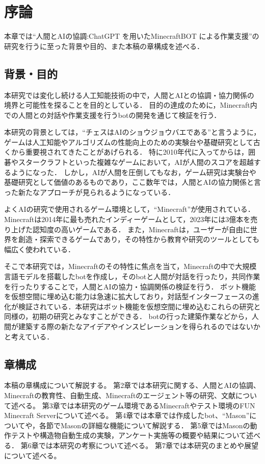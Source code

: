 \chapter{序論}	
\thispagestyle{plain}   %

本章では``人間とAIの協調:ChatGPT を用いたMinecraftBOT による作業支援''の研究を行うに至った背景や目的、また本稿の章構成を述べる．

\section{背景・目的}
本研究では変化し続ける人工知能技術の中で，人間とAIとの協調・協力関係の境界と可能性を探ることを目的としている．
目的の達成のために，Minecraft内での人間との対話や作業支援を行うbotの開発を通じて検証を行う．

本研究の背景としては，``チェスはAIのショウジョウバエである''\cite{bib:chess}と言うように，ゲームは人工知能やアルゴリズムの性能向上のための実験台や基礎研究として古くから重要視されてきたことがあげられる．
特に2010年代に入ってからは，囲碁やスタークラフトといった複雑なゲームにおいて，AIが人間のスコアを超越するようになった\cite{bib:AplpaGo,bibAlphaStar}．
しかし，AIが人間を圧倒してもなお，ゲーム研究は実験台や基礎研究として価値のあるものであり，ここ数年では，人間とAIの協力関係と言った新たなアプローチが見られるようになっている\cite{bib:maia,bib:craft_assist}．

よくAIの研究で使用されるゲーム環境として，``Minecraft''\cite{bib:Minecraft}が使用されている．
Minecraftは2014年に最も売れたインディーゲームとして，2023年には3億本を売り上げた認知度の高いゲームである\cite{bib:minecraft_news}．
また，Minecraftは，ユーザーが自由に世界を創造・探索できるゲームであり，その特性から教育や研究のツールとしても幅広く使われている．

そこで本研究では，Minecraftのその特性に焦点を当て，Minecraftの中で大規模言語モデルを搭載したbotを作成し，そのbotと人間が対話を行ったり，共同作業を行ったりすることで，人間とAIの協力・協調関係の検証を行う．
ボット機能を仮想空間に埋め込む能力は急速に拡大しており，対話型インターフェースの進化が検証されている．本研究はボット機能を仮想空間に埋め込むこれらの研究と同様の，初期の研究とみなすことができる．
botの行った建築作業などから，人間が建築する際の新たなアイデアやインスピレーションを得られるのではないかと考えている．

\section{章構成}
本稿の章構成について解説する。
第2章では本研究に関する、人間とAIの協調、Minecraftの教育性、自動生成、Minecraftのエージェント等の研究、文献について述べる。
第3章では本研究のゲーム環境であるMinecraftやテスト環境のFUN Minecraft Serverについて述べる。
第4章では本章では作成したbot、``Mason''についてや，各節でMasonの詳細な機能について解説する．
第5章ではMasonの動作テストや構造物自動生成の実験，アンケート実施等の概要や結果について述べる．
第6章では本研究の考察について述べる。
第7章では本研究のまとめや展望について述べる。